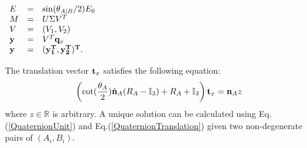 \documentclass[twocolumn,10pt]{asme2ej}
\newcommand{\nn}{{\bf n}}
\newcommand{\ttt}{{\bf t}}
\newcommand{\qq}{{\bf q}}
\begin{document}
\begin{center}
$\begin{array}{lcl}
E & = & \sin(\theta_{A|B}/2)E_0\\
M & = & U\Sigma V^{T}\\
V & = & (V_{1}, V_{2})\\
\bf y & = & V^{T}\qq_{x}\\
\bf y & = & (\bf y^{T}_{1},\bf y^{T}_{2} )^{T}.
\end{array}$
\end{center}
The translation vector $\ttt_{x}$ satisfies the following equation:
\begin{equation}
\left(\cot(\dfrac{\theta_{A}}{2})\hat{\nn}_{A}(R_{A}-\mathbb{I}_{3})+ R_{A} + \mathbb{I}_{3}\right)\ttt_{x} = \nn_{A}z
\label{QuaternionTranslation} 
\end{equation}
where $z \in \mathbb{R}$ is arbitrary. A unique solution can be calculated using Eq.(\ref{QuaternionUnit}) and Eq.(\ref{QuaternionTranslation}) given two non-degenerate pairs of $(A_{i}, B_{i})$.
\end{document}

